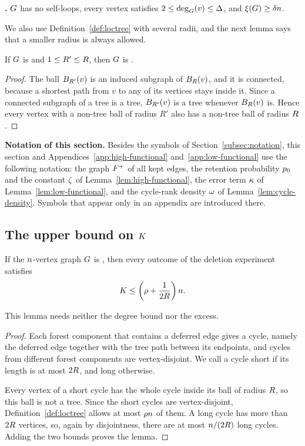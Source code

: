 \medskip
\noindent\textbf{\Hyp.} \(G\) has no self-loops, every vertex satisfies
\(2\le\deg_{G}(v)\le\Delta\), and \(\xi(G)\ge\delta n\).

\medskip
We also use Definition~\ref{def:loctree} with several radii, and the next lemma
says that a smaller radius is always allowed.

\begin{lemma}[Monotonicity]\label{lem:loctree-monotone}
If \(G\) is \loctree{\rad}{\nontree} and \(1\le R'\le R\), then
\(G\) is .
\end{lemma}

\begin{proof}
The ball \(B_{R'}(v)\) is an induced subgraph of \(B_{R}(v)\), and it
is connected, because a shortest path from \(v\) to any of its vertices stays
inside it. Since a connected subgraph of a tree is a tree, \(B_{R'}(v)\) is
a tree whenever \(B_{R}(v)\) is. Hence every vertex with a non-tree ball
of radius \(R'\) also has a non-tree ball of radius \(R\).
\end{proof}

\medskip
\noindent\textbf{Notation of this section.} Besides the symbols of
Section~\ref{subsec:notation}, this section and Appendices~\ref{app:high-functional}
and~\ref{app:low-functional} use the following notation: the graph
\({F^{+}}\) of all kept edges, the retention probability \(p_0\) and the constant
\(\zeta\) of Lemma~\ref{lem:high-functional}, the error term \(\kappa\) of
Lemma~\ref{lem:low-functional}, and the cycle-rank density \(\omega\) of
Lemma~\ref{lem:cycle-density}. Symbols that appear only in an appendix are
introduced there.

\subsection{The upper bound on \texorpdfstring{\(K\)}{K}}

\begin{Kboundrestatement}
If the \(n\)-vertex graph \(G\) is \loctree{\rad}{\nontree}, then
every outcome of the deletion experiment satisfies
\[
  K\le\left(\rho+\frac{1}{2R}\right)n .
\]
\end{Kboundrestatement}

This lemma needs neither the degree bound nor the excess.

\begin{proof}
Each forest component that contains a deferred edge gives a cycle, namely the
deferred edge together with the tree path between its endpoints, and cycles
from different forest components are vertex-disjoint. We call a cycle short if
its length is at most \(2R\), and long otherwise.

Every vertex of a short cycle has the whole cycle inside its ball of radius
\(R\), so this ball is not a tree. Since the short cycles are
vertex-disjoint, Definition~\ref{def:loctree} allows at most \(\rho n\)
of them. A long cycle has more than \(2R\) vertices, so, again by
disjointness, there are at most \(n/(2R)\) long cycles. Adding the two
bounds proves the lemma.
\end{proof}

